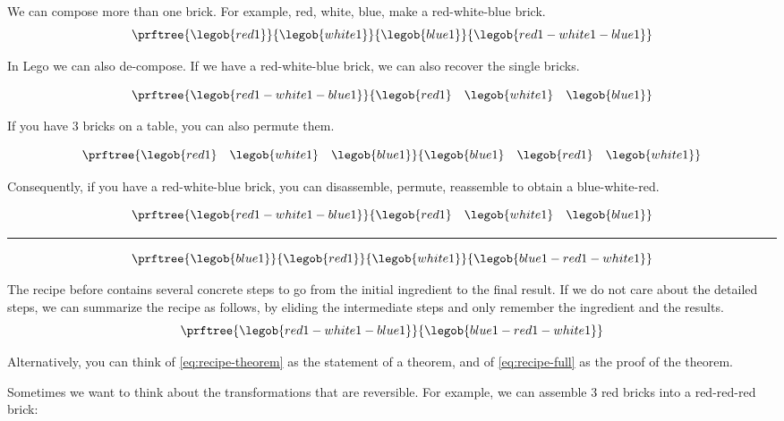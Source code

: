 We can compose more than one brick.
For example, red, white, blue, make a red-white-blue brick.
\begin{equation}
\prftree{\legob{red1}}{\legob{white1}}{\legob{blue1}}{\legob{red1-white1-blue1}}
\end{equation}

In Lego we can also de-compose. If we have a red-white-blue brick, we can also recover
the single bricks.

\begin{equation}
  \prftree{\legob{red1-white1-blue1}}{\legob{red1}\quad\legob{white1}\quad \legob{blue1} }
  \end{equation}

If you have 3 bricks on a table, you can also permute them.


\begin{equation}
\prftree{\legob{red1}\quad\legob{white1}\quad \legob{blue1}}{\legob{blue1}\quad\legob{red1}\quad \legob{white1} }
\end{equation}

Consequently, if you have a red-white-blue brick, you can disassemble, permute, reassemble to obtain a blue-white-red.

\begin{equation}\label{eq:recipe-full}
\prftree{\legob{red1-white1-blue1}}{\legob{red1}\quad\legob{white1}\quad \legob{blue1} }
\end{equation}
\hrule
\begin{equation}
\prftree{\legob{blue1}}{\legob{red1}}{\legob{white1}}{\legob{blue1-red1-white1}}
\end{equation}

The recipe before contains several concrete steps to go from the initial ingredient to the final result.
If we do not care about the detailed steps, we can summarize the recipe as follows, by eliding the intermediate steps and only remember the ingredient and the results.
\begin{equation}\label{eq:recipe-theorem}
\prftree{\legob{red1-white1-blue1}}{\legob{blue1-red1-white1}}
\end{equation}

Alternatively, you can think of \cref{eq:recipe-theorem} as the statement of a theorem, and of \cref{eq:recipe-full} as the proof of the theorem.

Sometimes we want to think about the transformations that are reversible.
For example, we can assemble 3 red bricks into a red-red-red brick:


